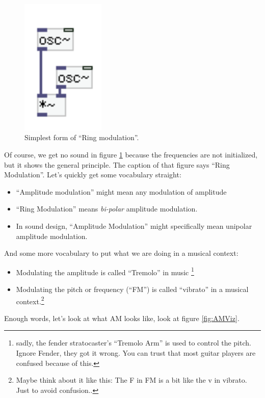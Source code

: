 \begin{figure}[H]
	\begin{center}
		\includegraphics[width = 4cm]{img/ringNaive.png}
		\caption{Simplest form of ``Ring modulation''.}
		\label{fig:simpleAM}
	\end{center}
\end{figure}
Of course, we get no sound in figure \ref{fig:simpleAM} because the frequencies are not initialized, but it shows the general principle. The caption of that figure says ``Ring Modulation''. Let's quickly get some vocabulary straight:\\
\begin{itemize}
	\item ``Amplitude modulation'' might mean any modulation of amplitude
	\item ``Ring Modulation'' means \textit{bi-polar} amplitude modulation.
	\item In sound design, ``Amplitude Modulation'' might specifically mean unipolar amplitude modulation.
\end{itemize}

And some more vocabulary to put what we are doing in a musical context:
\begin{itemize}
	\item Modulating the amplitude is called ``Tremolo'' in music \footnote{sadly, the fender stratocaster's ``Tremolo Arm'' is used to control the pitch. Ignore Fender, they got it wrong. You can trust that most guitar players are confused because of this.}
	\item Modulating the pitch or frequency (``FM'') is called ``vibrato'' in a musical context.\footnote{Maybe think about it like this: The F in FM is a bit like the v in vibrato. Just to avoid confusion..}
\end{itemize}

Enough words, let's look at what AM looks like, look at figure \ref{fig:AMViz}.


